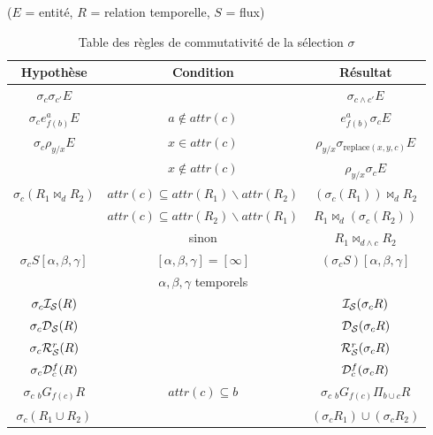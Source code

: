 \begin{table}[p]
\centering
($E$ = entité, $R$ = relation temporelle, $S$ = flux)
\begin{tabular}{|c|c|c|} \bottomrule
\rowcolor{hypcolor} Hypothèse & Condition & Résultat \\ \hline
    $\sigma_c \sigma_{c'} E$ & & $\sigma_{c\wedge c'} E$ \\ \hline
    $\sigma_c e_{f(b)}^a E$ & $a \not\in attr(c)$ & $e_{f(b)}^a \sigma_c E$ \\ \hline
    \multirow{2}{*}{$\sigma_c \rho_{y/x} E$} & $x \in attr(c)$ & $\rho_{y/x}\sigma_{\textrm{replace}(x,y,c)}  E$ \\ \cline{2-3}
    & $x\not\in attr(c)$ & $\rho_{y/x}\sigma_c E$ \\ \hline
    \multirow{3}{*}{$\sigma_c(R_1\Join_d R_2)$} & $attr(c)\subseteq attr(R_1)\backslash attr(R_2)$ & $(\sigma_c(R_1)) \Join_d R_2$  \\ \cline{2-3}
    & $attr(c)\subseteq attr(R_2)\backslash attr(R_1)$ & $R_1 \Join_d (\sigma_c(R_2))$ \\ \cline{2-3}
    & sinon & $R_1 \Join_{d \wedge c} R_2$  \\ \hline
    \multirow{2}{*}{$\sigma_c S[\alpha,\beta,\gamma]$} & $[\alpha,\beta,\gamma]=[\infty]$ & \multirow{2}{*}{$(\sigma_c S)[\alpha,\beta,\gamma]$} \\ \cline{2-2}
     & $\alpha,\beta,\gamma$ temporels & \\ \hline
    $\sigma_c \mathcal{I_S}(R)$ &  & $\mathcal{I_S}(\sigma_c R)$ \\ \hline
    $\sigma_c \mathcal{D_S}(R)$ &  & $\mathcal{D_S}(\sigma_c R)$ \\ \hline
    $\sigma_c \mathcal{R}_{\mathcal S}^{r}(R)$ & & $\mathcal{R}_{\mathcal S}^{r}(\sigma_c R)$ \\ \hline
    $\sigma_c \mathcal{D}_c^f(R)$ & & $\mathcal{D}_c^f(\sigma_c R)$ \\ \hline
    $\sigma_c \ {}_{b} G_{f(c)} R$ & $attr(c)\subseteq b$ & $\sigma_c\  {}_{b} G_{f(c)}  \Pi_{b \cup c} R$ \\ \hline
    $\sigma_c (R_1\cup R_2)$ & &  $(\sigma_c R_1)\cup (\sigma_c R_2)$  \\ \toprule
\end{tabular}
\caption{Table des règles de commutativité de la sélection $\sigma$}\label{tab:selection}
\end{table}

